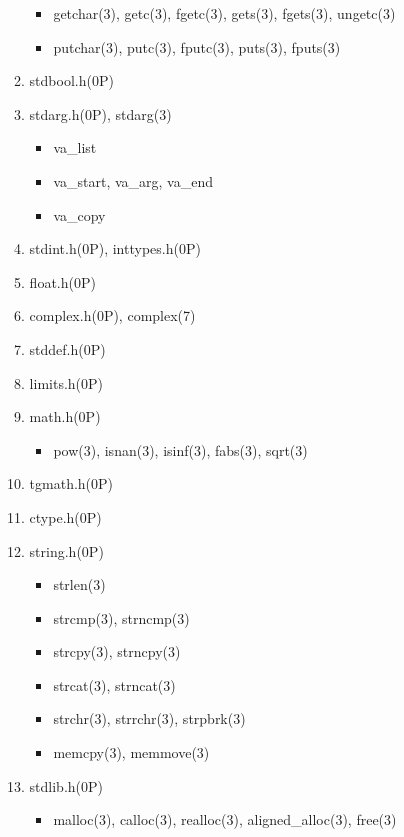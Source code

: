 \documentclass{article}
\begin{document}
\begin{enumerate}
\begin{enumerate}
\begin{itemize}
                    \item getchar(3), getc(3), fgetc(3), gets(3), fgets(3), ungetc(3)
                    \item putchar(3), putc(3), fputc(3), puts(3), fputs(3)
                \end{itemize}
            \item stdbool.h(0P)
            \item stdarg.h(0P), stdarg(3)
                \begin{itemize}
                    \item va_list
                    \item va_start, va_arg, va_end
                    \item va_copy
                \end{itemize}
            \item stdint.h(0P), inttypes.h(0P)
            \item float.h(0P)
            \item complex.h(0P), complex(7)
            \item stddef.h(0P)
            \item limits.h(0P)
            \item math.h(0P)
                \begin{itemize}
                    \item pow(3), isnan(3), isinf(3), fabs(3), sqrt(3)
                \end{itemize}
            \item tgmath.h(0P)
            \item ctype.h(0P)
            \item string.h(0P)
                \begin{itemize}
                    \item strlen(3)
                    \item strcmp(3), strncmp(3)
                    \item strcpy(3), strncpy(3)
                    \item strcat(3), strncat(3)
                    \item strchr(3), strrchr(3), strpbrk(3)
                    \item memcpy(3), memmove(3)
                \end{itemize}
            \item stdlib.h(0P)
                \begin{itemize}
                    \item malloc(3), calloc(3), realloc(3), aligned_alloc(3), free(3)

\end{itemize}
\end{enumerate}
\end{enumerate}
\end{document}
